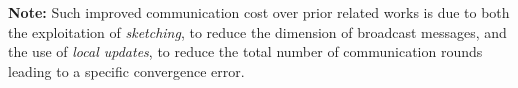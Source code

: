 \documentclass[twoside]{article}
\begin{document}
\textbf{Note:}
Such improved communication cost over prior related works is due to both the exploitation of \emph{sketching}, to reduce the dimension of broadcast messages, and the use of \emph{local updates}, to reduce the total number of communication rounds leading to a specific convergence error.
%
%        
\end{document}
